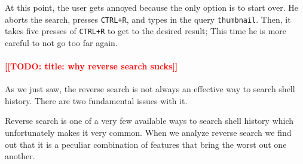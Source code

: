 \documentclass[thesis=M,english]{FITthesis}[2012/10/20]
\newcommand{\redtext}[1]{\textcolor{red}{[[#1]]}}
\begin{document}
At this point, the user gets annoyed because the only option is to start over. He aborts the search, presses \verb|CTRL+R|, and types in the query \verb|thumbnail|. Then, it takes five presses of \verb|CTRL+R| to get to the desired result; This time he is more careful to not go too far again.


\paragraph{\redtext{TODO: title: why reverse search sucks}}

As we just saw, the reverse search is not always an effective way to search shell history. There are two fundamental issues with it. 



Reverse search is one of a very few available ways to search shell history which unfortunately makes it very common. 
When we analyze reverse search we find out that it is a peculiar combination of features that bring the worst out one another.


\end{document}
